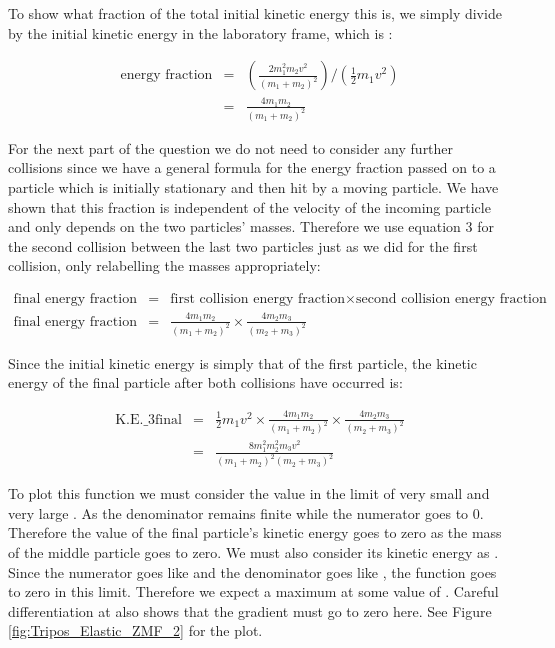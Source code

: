 \begin{problem}
{To show what fraction of the total initial kinetic energy this is, we simply divide by the initial kinetic energy in the laboratory frame, which is :

\begin{eqnarray}
\text{energy fraction} &=& \left(\frac{2 m_1^2 m_2 v^2}{\left(m_1 + m_2\right)^2}\right)/\left(\frac{1}{2}m_1v^2\right) \nonumber \\
&=& \frac{4m_{1}m_{2}}{(m_{1}+m_{2})^{2}}
\end{eqnarray}

For the next part of the question we do not need to consider any further collisions since we have a general formula for the energy fraction passed on to a particle which is initially stationary and then hit by a moving particle. We have shown that this fraction is independent of the velocity of the incoming particle and only depends on the two particles' masses. Therefore we use equation 3 for the second collision between the last two particles just as we did for the first collision, only relabelling the masses appropriately:

\begin{eqnarray*}
\text{final~energy~fraction} &=& \text{first~collision~energy~fraction} \times \text{second~collision~energy~fraction} \\
\text{final~energy~fraction} &=& \frac{4m_{1}m_{2}}{(m_{1}+m_{2})^{2}} \times \frac{4m_{2}m_{3}}{(m_{2}+m_{3})^{2}}
\end{eqnarray*}

Since the initial kinetic energy is simply that of the first particle, the kinetic energy of the final particle after both collisions have occurred is:

\begin{eqnarray*}
 \text{K.E._{3final}} &=& \frac{1}{2} m_1 v^2 \times \frac{4m_{1} m_{2}}{(m_{1}+m_{2})^{2}}\times \frac{4m_{2} m_{3}}{(m_{2}+m_{3})^{2}} \\
  &=& \frac{8 m_{1}^2 m_{2}^2 m_3 v^2}{(m_{1}+m_{2})^{2}(m_{2}+m_{3})^{2}}
\end{eqnarray*}

To plot this function we must consider the value in the limit of very small and very large . As  the denominator remains finite while the numerator goes to 0. Therefore the value of the final particle's kinetic energy goes to zero as the mass of the middle particle goes to zero. We must also consider its kinetic energy as . Since the numerator goes like  and the denominator goes like , the function goes to zero in this limit. Therefore we expect a maximum at some value of . Careful differentiation at  also shows that the gradient must go to zero here. See Figure \ref{fig:Tripos_Elastic_ZMF_2} for the plot. 

}
\end{problem}
